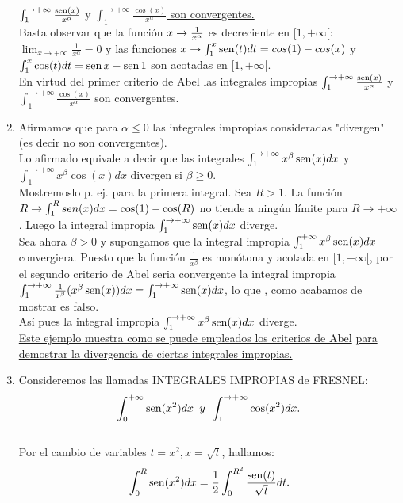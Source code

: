 \begin{enumerate}[1)]
{$\int_1^{\to +\infty}\frac{\operatorname{sen} (x)}{x^\alpha}$} y \underline{$\int_1^{\to +\infty}\frac{\cos (x)}{x^\alpha}$ son convergentes.}\\
Basta observar que la función $x \rightarrow \frac{1}{x^\alpha}$ es decreciente en $[1,+\infty[$: $\lim_{x \to +\infty}\frac{1}{x^\alpha}=0$ y las funciones $x \rightarrow \int_1^x \operatorname{sen} (t)dt=cos (1)-cos(x)$ y \x \flecha $\int_1^x \cos (t)dt=\operatorname{sen} x - \operatorname{sen} 1$ son acotadas en $[1,+\infty[$.\\
En virtud del primer criterio de Abel las integrales impropias $\int_1^{\to +\infty}\frac{\operatorname{sen} (x)}{x^\alpha}$ y $\int_1^{\to +\infty}\frac{\cos (x)}{x^\alpha}$ son convergentes. \\
\item Afirmamos que para $\alpha \leq 0$ las integrales impropias consideradas "divergen" (es decir no son convergentes). \\
Lo afirmado equivale a decir que las integrales $\int_1^{\to +\infty}x^\beta \operatorname{sen} (x) dx$ y $\int_1^{\to +\infty}x^\beta \cos (x) dx$ divergen si $\beta \geq 0$.\\
Mostremoslo p. ej. para la primera integral. Sea $R>1$. La función $R \rightarrow \int_1^{R} sen(x)dx=\cos (1)-\cos(R)$ no tiende a ningún límite para $R \to +\infty$. Luego la integral impropia $\int_1^{\to +\infty} \operatorname{sen} (x)dx$ diverge. \\
Sea ahora $\beta >0$ y supongamos que la integral impropia $\int_1^{+\infty} x^\beta \operatorname{sen} (x) dx$ convergiera. Puesto que la función \x \flecha $\frac{1}{x^\beta}$ es monótona y acotada en $[1,+\infty[$, por el segundo criterio de Abel seria convergente la integral impropia $\int_1^{\to +\infty}\frac{1}{x^\beta}(x^\beta \operatorname{sen} (x))dx=\int_1^{\to +\infty}\operatorname{sen} (x)dx$, lo que , como acabamos de mostrar es falso.
\\
Así pues la integral impropia $\int_1^{\to +\infty} x^\beta \operatorname{sen} (x)dx$ diverge.\\
\underline{Este ejemplo muestra como se puede empleados los criterios de Abel}
\underline{para demostrar la divergencia de ciertas integrales impropias.}
\item Consideremos las llamadas INTEGRALES IMPROPIAS de FRESNEL:\\
$$\int_0^{+\infty}\operatorname{sen}(x^2)dx \phantom{y}y \phantom{s}  \int_1^{\to +\infty}\cos (x^2)dx.$$\\
Por el cambio de variables $t=x^2, x=\sqrt{t}$, hallamos:\\
\begin{equation}
\int_0^R \sen(x^2)dx=\frac{1}{2}\int_0^{R^2}\frac{\sen (t)}{\sqrt{t}}dt.

\end{equation}
\end{enumerate}
